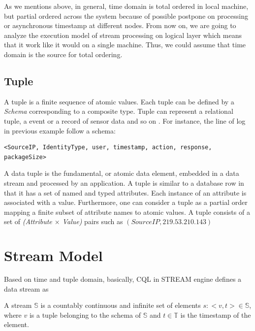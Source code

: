 As we mentions above, in general, time domain is total ordered in local machine, but partial ordered across the system because of possible postpone on processing or asynchronous timestamp at different nodes. From now on, we are going to analyze the execution model of stream processing on logical layer which means that it work like it would on a single machine. Thus, we could assume that time domain is the source for total ordering.


\subsection*{Tuple}
A tuple is a finite sequence of atomic values. Each tuple can be defined by a \textit{Schema} corresponding to a composite type. Tuple can represent a relational tuple, a event or a record of sensor data and so on \citep{Arasu:2006}. For instance, the line of log in previous example follow a schema:

\begin{verbatim}
<SourceIP, IdentityType, user, timestamp, action, response, packageSize>
\end{verbatim}

A data tuple is the fundamental, or atomic data element, embedded in a data stream and processed by an application. A tuple is similar to a database row in that it has a set of named and typed attributes. Each instance of an attribute is associated with a value\citep{Henrique:2014}. Furthermore, one can consider a tuple as a partial order mapping a finite subset of attribute names to atomic values\citep{Petit:2012}. A tuple consists of a set of \textit{(Attribute $\times$ Value)} pairs such as $(SourceIP, 219.53.210.143)$


\section{Stream Model}


Based on time and tuple domain, basically, CQL in STREAM  \citep{Arasu:2006} engine defines a data stream as
\begin{defi}
	A stream $\mathbb{S}$ is a countably continuous and infinite set of elements $s:<v,t> \in \mathbb{S}$, where $v$ is a tuple belonging to the schema of $\mathbb{S}$ and $t \in \mathbb{T}$ is the timestamp of the element. 
\end{defi}

